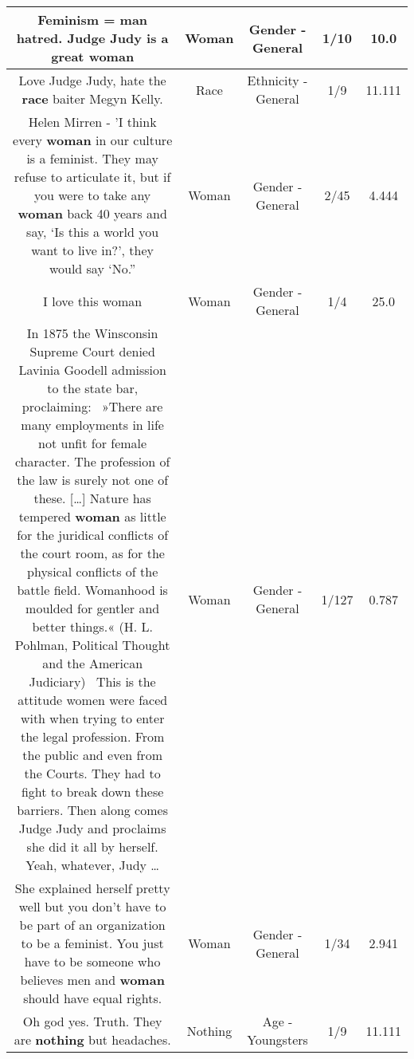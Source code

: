 \documentclass[11pt]{article}
\newlength\mylength
\begin{document}
\begin{center}
\begin{longtable}{|C{.65\mylength}|C{.30\mylength}|C{.12\mylength}|C{.12\mylength}|C{.12\mylength}|}
  \small Feminism = man hatred. Judge Judy is a great woman\normalsize   & Woman & Gender - General & 1/10 & 10.0 \\  \hline
  \small Love Judge Judy, hate the \textbf{race} baiter Megyn Kelly.\normalsize   & Race & Ethnicity - General & 1/9 & 11.111 \\  \hline
  \small Helen Mirren - 'I think every \textbf{woman} in our culture is a feminist. They may refuse to articulate it, but if you were to take any \textbf{woman} back 40 years and say, ‘Is this a world you want to live in?', they would say ‘No.''\normalsize   & Woman & Gender - General & 2/45 & 4.444 \\  \hline
  \small I love this woman\normalsize   & Woman & Gender - General & 1/4 & 25.0 \\  \hline
  \small In 1875 the Winsconsin Supreme Court denied Lavinia Goodell admission to the state bar, proclaiming:  »There are many employments in life not unfit for female character. The profession of the law is surely not one of these. […] Nature has tempered \textbf{woman} as little for the juridical conflicts of the court room, as for the physical conflicts of the battle field. Womanhood is moulded for gentler and better things.« (H. L. Pohlman, Political Thought and the American Judiciary)  This is the attitude women were faced with when trying to enter the legal profession. From the public and even from the Courts. They had to fight to break down these barriers. Then along comes Judge Judy and proclaims she did it all by herself. Yeah, whatever, Judy …\normalsize   & Woman & Gender - General & 1/127 & 0.787 \\  \hline
  \small She explained herself pretty well but you don't have to be part of an organization to be a feminist.  You just have to be someone who believes men and \textbf{woman} should have equal rights.\normalsize   & Woman & Gender - General & 1/34 & 2.941 \\  \hline
  \small Oh god yes. Truth. They are \textbf{nothing} but headaches.\normalsize   & Nothing & Age - Youngsters & 1/9 & 11.111 \\  \hline

\end{longtable}
\end{center}
\end{document}
